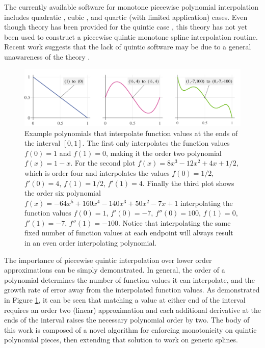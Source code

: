\documentclass{scspaperproc}
\theoremstyle{scsthe}
\begin{document}
The currently available software for monotone piecewise polynomial interpolation includes quadratic \cite{he1998monotone}, cubic \cite{fritsch1980monotone}, and quartic (with limited application) \cite{wang2004rational,piah2011improved,yao2018unconditionally} cases. Even though theory has been provided for the quintic case \cite{ulrich1994positivity,hess1994positive}, this theory has not yet been used to construct a piecewise quintic monotone spline interpolation routine. Recent work suggests that the lack of quintic software may be due to a general unawareness of the theory \cite{xie2018semiparametric}.

\begin{figure}
  \centering
  \includegraphics[width=.9\textwidth]{spline-demonstration}
  \caption{Example polynomials that interpolate function values at the ends of the interval $[0,1]$. The first only interpolates the function values $f(0) = 1$ and $f(1) = 0$, making it the order two polynomial $f(x) = 1 - x$. For the second plot $f(x) = 8x^3 - 12x^2 + 4x + 1/2$, which is order four and interpolates the values $f(0) = 1/2$, $f'(0) = 4$, $f(1) = 1/2$, $f'(1) = 4$. Finally the third plot shows the order six polynomial $f(x) = - 64x^5 + 160x^4 - 140x^3 + 50x^2 - 7x + 1$ interpolating the function values $f(0) = 1$, $f'(0) = -7$, $f''(0) = 100$, $f(1) = 0$, $f'(1) = -7$, $f''(1) = -100$. Notice that interpolating the same fixed number of function values at each endpoint will always result in an even order interpolating polynomial.
  }\label{fig:spline-demonstration}
\end{figure}

The importance of piecewise quintic interpolation over lower order approximations can be simply demonstrated. In general, the order of a polynomial determines the number of function values it can interpolate, and the growth rate of error away from the interpolated function values. As demonstrated in Figure \ref{fig:spline-demonstration}, it can be seen that matching a value at either end of the interval requires an order two (linear) approximation and each additional derivative at the ends of the interval raises the necessary polynomial order by two. The body of this work is composed of a novel algorithm for enforcing monotonicity on quintic polynomial pieces, then extending that solution to work on generic splines.
\end{document}

